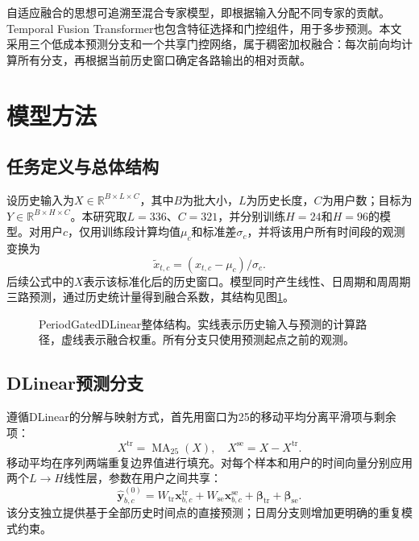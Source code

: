 \documentclass[UTF8,a4paper,zihao=5,fontset=windows]{ctexart}
\begin{document}
自适应融合的思想可追溯至混合专家模型，即根据输入分配不同专家的贡献\cite{jacobs1991moe}。Temporal Fusion Transformer也包含特征选择和门控组件，用于多步预测\cite{lim2021tft}。本文采用三个低成本预测分支和一个共享门控网络，属于稠密加权融合：每次前向均计算所有分支，再根据当前历史窗口确定各路输出的相对贡献。

\section{模型方法}
\subsection{任务定义与总体结构}
设历史输入为$X\in\mathbb{R}^{B\times L\times C}$，其中$B$为批大小，$L$为历史长度，$C$为用户数；目标为$Y\in\mathbb{R}^{B\times H\times C}$。本研究取$L=336$、$C=321$，并分别训练$H=24$和$H=96$的模型。对用户$c$，仅用训练段计算均值$\mu_c$和标准差$\sigma_c$，并将该用户所有时间段的观测变换为
\begin{equation}
\widetilde x_{t,c}=(x_{t,c}-\mu_c)/\sigma_c.
\label{eq:standard}
\end{equation}
后续公式中的$X$表示该标准化后的历史窗口。模型同时产生线性、日周期和周周期三路预测，通过历史统计量得到融合系数，其结构见图\ref{fig:model}。

\begin{figure}[t]
\centering
\resizebox{.96\textwidth}{!}{}
\caption{PeriodGatedDLinear整体结构。实线表示历史输入与预测的计算路径，虚线表示融合权重。所有分支只使用预测起点之前的观测。}
\label{fig:model}
\end{figure}

\subsection{DLinear预测分支}
遵循DLinear的分解与映射方式\cite{zeng2023dlinear}，首先用窗口为25的移动平均分离平滑项与剩余项：
\begin{equation}
X^{\mathrm{tr}}=\operatorname{MA}_{25}(X),\quad
X^{\mathrm{se}}=X-X^{\mathrm{tr}}.
\end{equation}
移动平均在序列两端重复边界值进行填充。对每个样本和用户的时间向量分别应用两个$L\rightarrow H$线性层，参数在用户之间共享：
\begin{equation}
\widehat{\boldsymbol y}^{(0)}_{b,c}
=W_{\mathrm{tr}}\boldsymbol x^{\mathrm{tr}}_{b,c}
+W_{\mathrm{se}}\boldsymbol x^{\mathrm{se}}_{b,c}
+\boldsymbol\beta_{\mathrm{tr}}+\boldsymbol\beta_{\mathrm{se}}.
\end{equation}
该分支独立提供基于全部历史时间点的直接预测；日周分支则增加更明确的重复模式约束。
\end{document}
